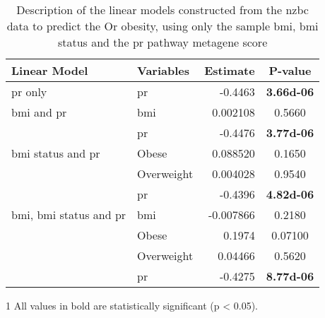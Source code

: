 	\begin{table}[htpb]
		\centering
		\caption[Description of the linear models constructed from the \gls{nzbc} data to predict the Or obesity, using only the sample \gls{bmi}, \gls{bmi} status and the \acrshort{pr} pathway metagene score]{Description of the linear models constructed from the \gls{nzbc} data to predict the Or obesity, using only the sample \gls{bmi}, \gls{bmi} status and the \gls{pr} pathway metagene score}
		\label{tab:lm_pr_only_or}
		\begin{threeparttable}
			\begin{tabular}{llrc}
				Linear Model & Variables & Estimate & {P-value}\\
					\hline
					\hline
					\rule{0pt}{2.25ex}\gls{pr} only                            & \gls{pr}   & -0.4463   & \bfseries \num{3.66d-06} \tnote{1}\\
					\hline
					\rule{0pt}{2.25ex}\gls{bmi} and \gls{pr}                   & \gls{bmi}  & 0.002108  & 0.5660   \\
                                                                               & \gls{pr}   & -0.4476   & \bfseries \num{3.77d-06} \\
					\hline
					\rule{0pt}{2.25ex}\gls{bmi} status and \gls{pr}            & Obese      & 0.088520  & 0.1650   \\
                                                                               & Overweight & 0.004028  & 0.9540   \\
                                                                               & \gls{pr}   & -0.4396   & \bfseries \num{4.82d-06} \\
					\hline
					\rule{0pt}{2.25ex}\gls{bmi}, \gls{bmi} status and \gls{pr} & \gls{bmi}  & -0.007866 & 0.2180   \\
                                                                               & Obese      & 0.1974    & 0.07100  \\
                                                                               & Overweight & 0.04466   & 0.5620   \\
                                                                               & \gls{pr}   & -0.4275   & \bfseries \num{8.77d-06} \\
					\hline
					\hline
			\end{tabular}
				\begin{tablenotes}
					\begin{footnotesize}
					\item [1] All values in bold are statistically significant (p \textless{} 0.05).
					\end{footnotesize}
				\end{tablenotes}
		\end{threeparttable}
	\end{table}

